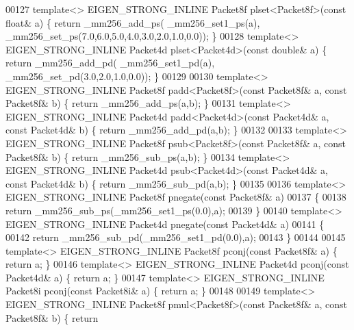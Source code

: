 \begin{DoxyCode}
00127 \textcolor{keyword}{template}<> EIGEN\_STRONG\_INLINE Packet8f plset<Packet8f>(\textcolor{keyword}{const} \textcolor{keywordtype}{float}& a) \{ \textcolor{keywordflow}{return} \_mm256\_add\_ps(
      \_mm256\_set1\_ps(a), \_mm256\_set\_ps(7.0,6.0,5.0,4.0,3.0,2.0,1.0,0.0)); \}
00128 \textcolor{keyword}{template}<> EIGEN\_STRONG\_INLINE Packet4d plset<Packet4d>(\textcolor{keyword}{const} \textcolor{keywordtype}{double}& a) \{ \textcolor{keywordflow}{return} \_mm256\_add\_pd(
      \_mm256\_set1\_pd(a), \_mm256\_set\_pd(3.0,2.0,1.0,0.0)); \}
00129 
00130 \textcolor{keyword}{template}<> EIGEN\_STRONG\_INLINE Packet8f padd<Packet8f>(\textcolor{keyword}{const} Packet8f& a, \textcolor{keyword}{const} Packet8f& b) \{ \textcolor{keywordflow}{return} 
      \_mm256\_add\_ps(a,b); \}
00131 \textcolor{keyword}{template}<> EIGEN\_STRONG\_INLINE Packet4d padd<Packet4d>(\textcolor{keyword}{const} Packet4d& a, \textcolor{keyword}{const} Packet4d& b) \{ \textcolor{keywordflow}{return} 
      \_mm256\_add\_pd(a,b); \}
00132 
00133 \textcolor{keyword}{template}<> EIGEN\_STRONG\_INLINE Packet8f psub<Packet8f>(\textcolor{keyword}{const} Packet8f& a, \textcolor{keyword}{const} Packet8f& b) \{ \textcolor{keywordflow}{return} 
      \_mm256\_sub\_ps(a,b); \}
00134 \textcolor{keyword}{template}<> EIGEN\_STRONG\_INLINE Packet4d psub<Packet4d>(\textcolor{keyword}{const} Packet4d& a, \textcolor{keyword}{const} Packet4d& b) \{ \textcolor{keywordflow}{return} 
      \_mm256\_sub\_pd(a,b); \}
00135 
00136 \textcolor{keyword}{template}<> EIGEN\_STRONG\_INLINE Packet8f pnegate(\textcolor{keyword}{const} Packet8f& a)
00137 \{
00138   \textcolor{keywordflow}{return} \_mm256\_sub\_ps(\_mm256\_set1\_ps(0.0),a);
00139 \}
00140 \textcolor{keyword}{template}<> EIGEN\_STRONG\_INLINE Packet4d pnegate(\textcolor{keyword}{const} Packet4d& a)
00141 \{
00142   \textcolor{keywordflow}{return} \_mm256\_sub\_pd(\_mm256\_set1\_pd(0.0),a);
00143 \}
00144 
00145 \textcolor{keyword}{template}<> EIGEN\_STRONG\_INLINE Packet8f pconj(\textcolor{keyword}{const} Packet8f& a) \{ \textcolor{keywordflow}{return} a; \}
00146 \textcolor{keyword}{template}<> EIGEN\_STRONG\_INLINE Packet4d pconj(\textcolor{keyword}{const} Packet4d& a) \{ \textcolor{keywordflow}{return} a; \}
00147 \textcolor{keyword}{template}<> EIGEN\_STRONG\_INLINE Packet8i pconj(\textcolor{keyword}{const} Packet8i& a) \{ \textcolor{keywordflow}{return} a; \}
00148 
00149 \textcolor{keyword}{template}<> EIGEN\_STRONG\_INLINE Packet8f pmul<Packet8f>(\textcolor{keyword}{const} Packet8f& a, \textcolor{keyword}{const} Packet8f& b) \{ \textcolor{keywordflow}{return} 

\end{DoxyCode}
